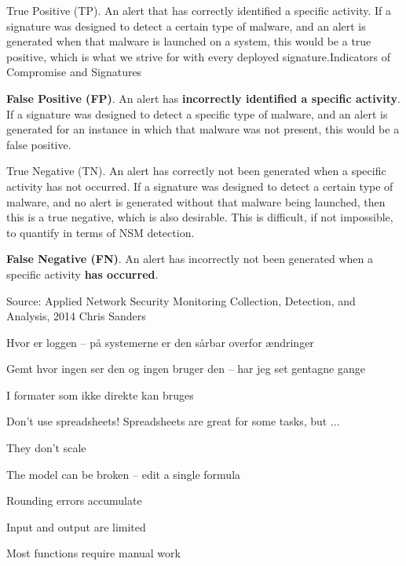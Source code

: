 \documentclass[Screen16to9,17pt]{foils}
\begin{document}
\begin{list2}\small
\item True Positive (TP). An alert that has correctly identified a specific activity. If a signature was designed to detect a certain type of malware, and an alert is generated when that malware is launched on a system, this would be a true positive, which is what we strive for with every deployed signature.Indicators of Compromise and Signatures
\item {\bf False Positive (FP)}. An alert has {\bf incorrectly identified a specific activity}. If a signature was designed to detect a specific type of malware, and an alert is generated for an instance in which that malware was not present, this would be a false positive.
\item True Negative (TN). An alert has correctly not been generated when a specific activity has not occurred. If a signature was designed to detect a certain type of malware, and no alert is generated without that malware being launched, then this is a true negative, which is also desirable. This is difficult, if not impossible, to quantify in terms of NSM detection.
\item {\bf False Negative (FN)}. An alert has incorrectly not been generated when a specific activity {\bf has occurred}.
\end{list2}

Source: Applied Network Security Monitoring Collection, Detection, and Analysis, 2014 Chris Sanders

\begin{list2}
\item Hvor er loggen -- på systemerne er den sårbar overfor ændringer
\item Gemt hvor ingen ser den og ingen bruger den -- har jeg set gentagne gange
\item I formater som ikke direkte kan bruges
\end{list2}




Don't use spreadsheets! Spreadsheets are great for some tasks, but ...
\begin{list2}
\item They don't scale
\item The model can be broken -- edit a single formula
\item Rounding errors accumulate
\item Input and output are limited
\item Most functions require manual work
\end{list2}
\end{document}
